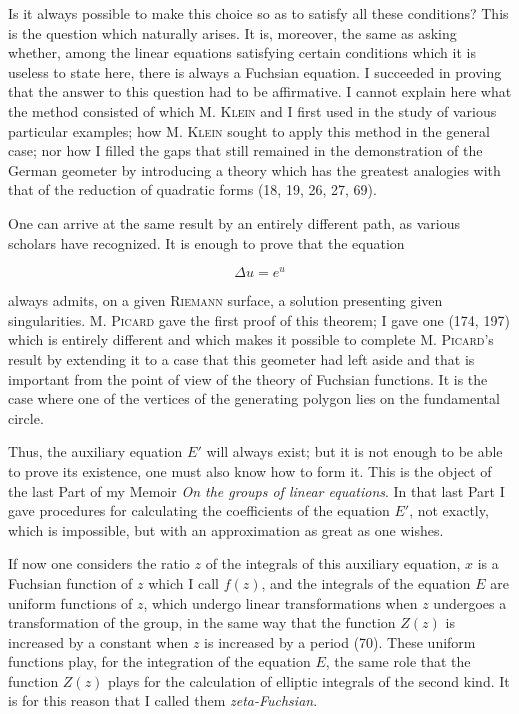 \documentclass[11pt]{article}
\begin{document}
Is it always possible to make this choice so as to satisfy all these conditions? This is the question which naturally arises. It is, moreover, the same as asking whether, among the linear equations satisfying certain conditions which it is useless to state here, there is always a Fuchsian equation. I succeeded in proving that the answer to this question had to be affirmative. I cannot explain here what the method consisted of which M. \textsc{Klein} and I first used in the study of various particular examples; how M. \textsc{Klein} sought to apply this method in the general case; nor how I filled the gaps that still remained in the demonstration of the German geometer by introducing a theory which has the greatest analogies with that of the reduction of quadratic forms (18, 19, 26, 27, 69).

One can arrive at the same result by an entirely different path, as various scholars have recognized. It is enough to prove that the equation

\[
 \Delta u=e^u
\]

always admits, on a given \textsc{Riemann} surface, a solution presenting given singularities. M. \textsc{Picard} gave the first proof of this theorem; I gave one (174, 197) which is entirely different and which makes it possible to complete M. \textsc{Picard}’s result by extending it to a case that this geometer had left aside and that is important from the point of view of the theory of Fuchsian functions. It is the case where one of the vertices of the generating polygon lies on the fundamental circle.

Thus, the auxiliary equation $E'$ will always exist; but it is not enough to be able to prove its existence, one must also know how to form it. This is the object of the last Part of my Memoir \emph{On the groups of linear equations}. In that last Part I gave procedures for calculating the coefficients of the equation $E'$, not exactly, which is impossible, but with an approximation as great as one wishes.

If now one considers the ratio $z$ of the integrals of this auxiliary equation, $x$ is a Fuchsian function of $z$ which I call $f(z)$, and the integrals of the equation $E$ are uniform functions of $z$, which undergo linear transformations when $z$ undergoes a transformation of the group, in the same way that the function $Z(z)$ is increased by a constant when $z$ is increased by a period (70). These uniform functions play, for the integration of the equation $E$, the same role that the function $Z(z)$ plays for the calculation of elliptic integrals of the second kind. It is for this reason that I called them \emph{zeta-Fuchsian}.
\end{document}
